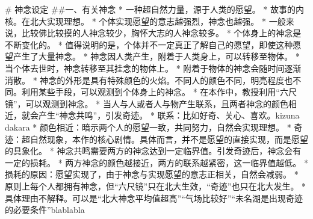 # 神念设定
##一、有关神念
* 一种超自然力量，源于人类的愿望。
	* 故事的内核。在北大实现理想。
* 个体实现愿望的意志越强烈，神念也越强。
	* 一般来说，比较佛比较摸的人神念较少，胸怀大志的人神念较多。
	* 个体身上的神念是不断变化的。	
	* 值得说明的是，个体并不一定真正了解自己的愿望，即使这种愿望产生了大量神念。
* 神念因人类产生，附着于人类身上，可以转移至物体。
	* 当个体去世时，神念转移至其挂念的物体上。
	* 附着于物体的神念会随时间逐渐消散。
* 神念的外形是具有特殊颜色的火焰。不同人的颜色不同，明亮程度也不同。利用某些手段，可以观测到个体身上的神念。
	* 在本作中，教授利用“六尺镜”，可以观测到神念。
* 当人与人或者人与物产生联系，且两者神念的颜色相近，就会产生“神念共鸣”，引发奇迹。
	* 联系：比如好奇、关心、喜欢。kizuna dakara
	* 颜色相近：暗示两个人的愿望一致，共同努力，自然会实现理想。
	* 奇迹：超自然现象，本作的核心剧情。具体而言，并不是愿望的直接实现，而是愿望的具象化。
* 神念共鸣需要两方的神念达到一定临界值。引发奇迹后，神念会有一定的损耗。
	* 两方神念的颜色越接近，两方的联系越紧密，这一临界值越低。
	* 损耗的原因：愿望实现了，由于神念与实现愿望的意志正相关，自然会减弱。
* 原则上每个人都拥有神念，但“六尺镜”只在北大生效，“奇迹”也只在北大发生。
	* 具体理由不解释。可以是“北大神念平均值超高”“气场比较好”“未名湖是出现奇迹的必要条件”blablabla

